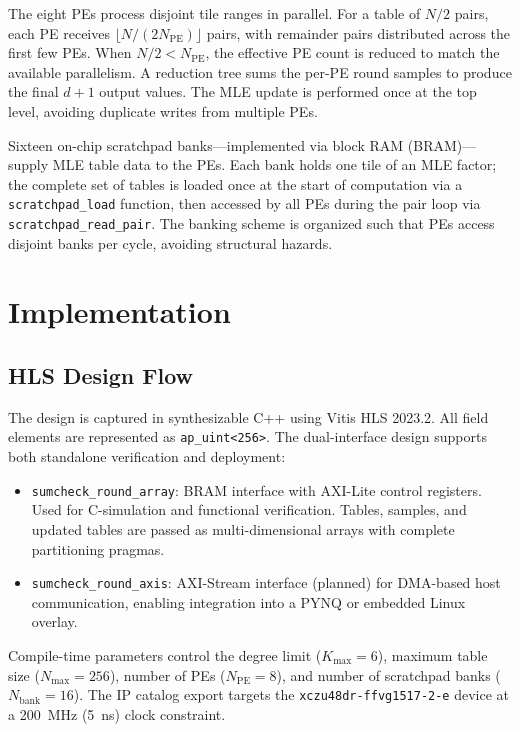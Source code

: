 \documentclass[conference]{IEEEtran}
\begin{document}
The eight PEs process disjoint tile ranges in parallel. For a table of $N/2$ pairs, each PE receives $\lfloor N/(2N_{\mathrm{PE}})\rfloor$ pairs, with remainder pairs distributed across the first few PEs. When $N/2 < N_{\mathrm{PE}}$, the effective PE count is reduced to match the available parallelism. A reduction tree sums the per-PE round samples to produce the final $d+1$ output values. The MLE update is performed once at the top level, avoiding duplicate writes from multiple PEs.

Sixteen on-chip scratchpad banks---implemented via block RAM (BRAM)---supply MLE table data to the PEs. Each bank holds one tile of an MLE factor; the complete set of tables is loaded once at the start of computation via a \texttt{scratchpad\_load} function, then accessed by all PEs during the pair loop via \texttt{scratchpad\_read\_pair}. The banking scheme is organized such that PEs access disjoint banks per cycle, avoiding structural hazards.

\section{Implementation}

\subsection{HLS Design Flow}

The design is captured in synthesizable C++ using Vitis HLS 2023.2. All field elements are represented as \texttt{ap\_uint<256>}. The dual-interface design supports both standalone verification and deployment:

\begin{itemize}
\item \texttt{sumcheck\_round\_array}: BRAM interface with AXI-Lite control registers. Used for C-simulation and functional verification. Tables, samples, and updated tables are passed as multi-dimensional arrays with complete partitioning pragmas.
\item \texttt{sumcheck\_round\_axis}: AXI-Stream interface (planned) for DMA-based host communication, enabling integration into a PYNQ or embedded Linux overlay.
\end{itemize}

Compile-time parameters control the degree limit ($K_{\max}=6$), maximum table size ($N_{\max}=256$), number of PEs ($N_{\mathrm{PE}}=8$), and number of scratchpad banks ($N_{\mathrm{bank}}=16$). The IP catalog export targets the \texttt{xczu48dr-ffvg1517-2-e} device at a 200~MHz (5~ns) clock constraint.
\end{document}
